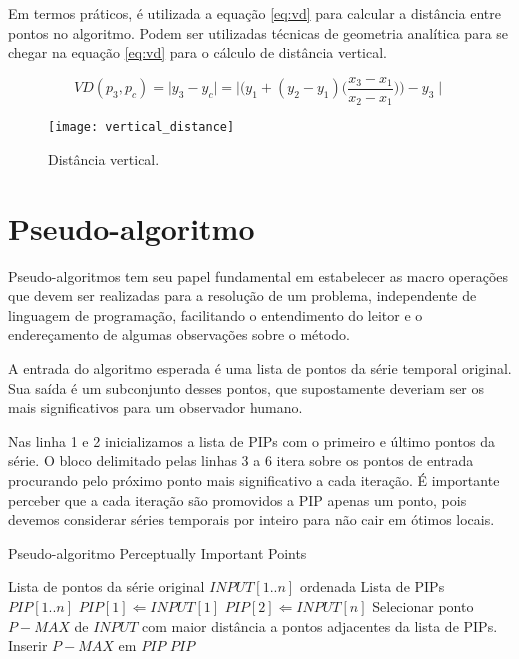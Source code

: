 Em termos práticos, é utilizada a equação \ref{eq:vd} para calcular a distância entre pontos no algoritmo. Podem ser utilizadas técnicas de geometria analítica para se chegar na equação \ref{eq:vd} para o cálculo de distância vertical.

\begin{equation}
\label{eq:vd}
VD(p_{3}, p_{c}) = \mid y_{3} - y_{c} \mid = \mid \Bigg( y_{1} + (y_{2} - y_{1})\bigg(\frac{ x_{3} - x_{1} }{x_{2} - x_{1}}\bigg) \Bigg) - y_{3} \mid
\end{equation}

\begin{figure}[h!]
  \begin{center}
    \texttt{[image: vertical\_distance]}
    \centering
    \caption{Distância vertical.}
  \label{fig:vertical-distance}
  \end{center}
\end{figure}

\section{Pseudo-algoritmo}
\label{sec:pseudo-algoritmo}
Pseudo-algoritmos tem seu papel fundamental em estabelecer as macro operações que devem ser realizadas para a resolução de um problema, independente de linguagem de programação, facilitando o entendimento do leitor e o endereçamento de algumas observações sobre o método.

A entrada do algoritmo esperada é uma lista de pontos da série temporal original. Sua saída é um subconjunto desses pontos, que supostamente deveriam ser os mais significativos para um observador humano.

Nas linha 1 e 2 inicializamos a lista de PIPs com o primeiro e último pontos da série. O bloco delimitado pelas linhas 3 a 6 itera sobre os pontos de entrada procurando pelo próximo ponto mais significativo a cada iteração. É importante perceber que a cada iteração são promovidos a PIP apenas um ponto, pois devemos considerar séries temporais por inteiro para não cair em ótimos locais.

\begin{algorithm}[h!]
  \caption{Pseudo-algoritmo Perceptually Important Points}
  \label{alg:PIP1}
  \begin{algorithmic}[1]
  \REQUIRE Lista de pontos da série original $INPUT[1..n]$ ordenada 
  \ENSURE Lista de PIPs $PIP[1..n]$
  \STATE $PIP[1] \Leftarrow INPUT[1]$
  \STATE $PIP[2] \Leftarrow INPUT[n]$
  \REPEAT
    \STATE Selecionar ponto $P-MAX$ de $INPUT$ com maior distância a pontos adjacentes da lista de PIPs. 
    \STATE Inserir $P-MAX$ em $PIP$
  \RETURN $PIP$
  \end{algorithmic}
\end{algorithm}


